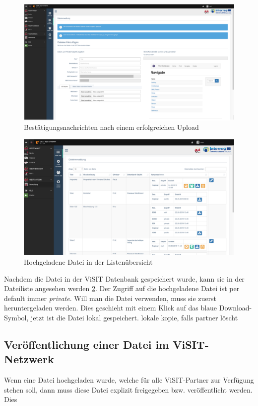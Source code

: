 \begin{figure}[ht!]
\centering
\includegraphics[width=12cm]{Figures/paula/dateiverwaltung/bestaetigung_nach_hochladen.png}
\caption{Bestätigungsnachrichten nach einem erfolgreichen Upload}
\label{img:bestaetigung_nach_hochladen}
\end{figure}

\begin{figure}[ht!]
\centering
\includegraphics[width=12cm]{Figures/paula/dateiverwaltung/datei_in_listenuebersicht.png}
\caption{Hochgeladene Datei in der Listenübersicht}
\label{img:datei_in_listenuebersichtn}
\end{figure}

Nachdem die Datei in der ViSIT Datenbank gespeichert wurde, kann sie in der Dateiliste angesehen werden \ref{img:datei_in_listenuebersichtn}. Der Zugriff auf die hochgeladene Datei ist per default immer \textit{private}. Will man die Datei verwenden, muss sie zuerst heruntergeladen werden. Dies geschieht mit einem Klick auf das blaue Download-Symbol, jetzt ist die Datei lokal gespeichert. lokale kopie, falls partner löscht

\subsection{Veröffentlichung einer Datei im ViSIT-Netzwerk}

Wenn eine Datei hochgeladen wurde, welche für alle ViSIT-Partner zur Verfügung stehen soll, dann muss diese Datei explizit freigegeben bzw. veröffentlicht werden. Dies
\cite{anno4j1}